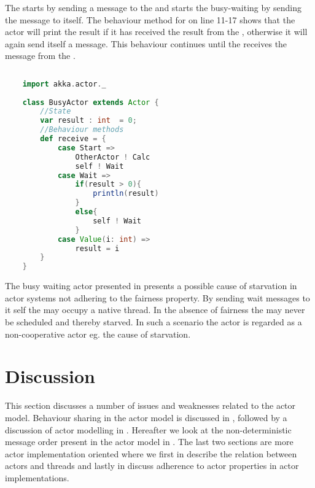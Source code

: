 The  starts by sending a message to the  and starts the busy-waiting by sending the  message to itself. The behaviour method for  on line 11-17 shows that the actor will print the result if it has received the result from the , otherwise it will again send itself a  message. This behaviour continues until the  receives the  message from the . 

\begin{lstlisting}[label=lst:actor_busywait,
  caption={Busy-waiting actor program written in the Scala Akka actor framework.},
  language=Scala,  
  showspaces=false,
  showtabs=false,
  breaklines=true,
  showstringspaces=false,
  breakatwhitespace=true,
  commentstyle=\color{greencomments},
  keywordstyle=\color{bluekeywords},
  stringstyle=\color{redstrings}]  % Start your code-block
	
	import akka.actor._
	
	class BusyActor extends Actor {
		//State
		var result : int  = 0;
		//Behaviour methods
		def receive = {
			case Start =>
				OtherActor ! Calc
				self ! Wait
			case Wait =>
				if(result > 0){
					println(result)
				}
				else{
					self ! Wait
				}	
			case Value(i: int) =>
				result = i
		}
	}
\end{lstlisting}

The busy waiting actor presented in  presents a possible cause of starvation in actor systems not adhering to the fairness property. By sending wait messages to it self the  may occupy a native thread. In the absence of fairness the  may never be scheduled and thereby starved. In such a scenario the actor  is regarded as a non-cooperative actor eg. the cause of starvation\cite{karmani2009actor}.
\section{Discussion}\label{sec:actor_discussion}
This section discusses a number of issues and weaknesses related to the actor model. Behaviour sharing in the actor model is discussed in , followed by a discussion of actor modelling in . Hereafter we look at the non-deterministic message order present in the actor model in . The last two sections are more actor implementation oriented where we first in  describe the relation between actors and threads and lastly in  discuss adherence to actor properties in actor implementations.

